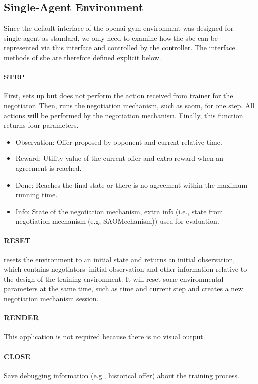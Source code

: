 \subsection{Single-Agent Environment} \label{single-agent-env}
Since the default interface of the \gls{openai gym} environment was designed for single-agent as standard, we only need to examine how the \gls{sbe} can be represented via this interface and controlled by the controller. The interface methods of \gls{sbe} are therefore defined explicit below. 

\paragraph{STEP} First, sets up but does not perform the action received from trainer for the negotiator. Then, runs the negotiation mechanism, such as \gls{saom}, for one step. All actions will be performed by the negotiation mechanism. Finally, this function returns four parameters.

\begin{itemize}
	\item Observation: Offer proposed by opponent and current relative time.
	\item Reward: Utility value of the current offer and extra reward when an agreement is reached.
	\item Done: Reaches the final state or there is no agreement within the maximum running time.
	\item Info: State of the negotiation mechanism, extra info (i.e., state from negotiation mechanism (e.g, SAOMechanism)) used for evaluation.
\end{itemize}

\paragraph{RESET} resets the environment to an initial state and returns an initial observation, which contains negotiators' initial observation and other information relative to the design of the training environment. It will reset some environmental parameters at the same time, such as time and current step and creates a new negotiation mechanism session.
\paragraph{RENDER} This application is not required because there is no visual output.
\paragraph{CLOSE} Save debugging information (e.g., historical offer) about the training process.
